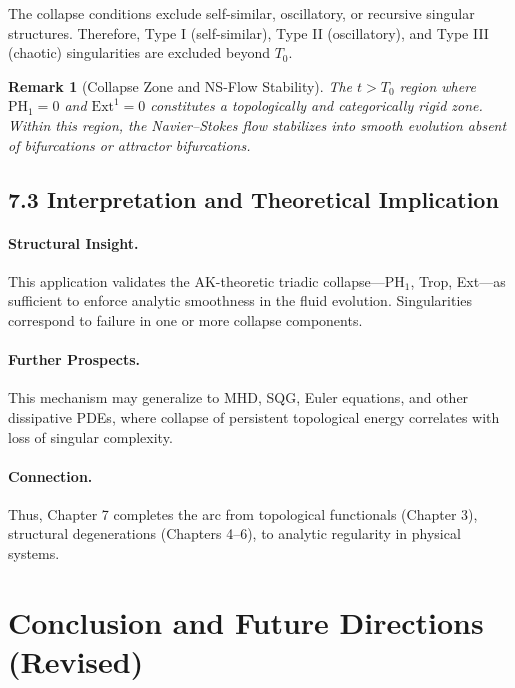 \documentclass[11pt]{article}
\newtheorem{remark}[theorem]{Remark}
\begin{document}
\begin{corollary}
The collapse conditions exclude self-similar, oscillatory, or recursive singular structures. Therefore, Type I (self-similar), Type II (oscillatory), and Type III (chaotic) singularities are excluded beyond $T_0$.
\end{corollary}

\begin{remark}[Collapse Zone and NS-Flow Stability]
The $t > T_0$ region where $\mathrm{PH}_1 = 0$ and $\mathrm{Ext}^1 = 0$ constitutes a topologically and categorically rigid zone. Within this region, the Navier--Stokes flow stabilizes into smooth evolution absent of bifurcations or attractor bifurcations.
\end{remark}

\subsection{7.3 Interpretation and Theoretical Implication}

\paragraph{Structural Insight.}
This application validates the AK-theoretic triadic collapse—PH$_1$, Trop, Ext—as sufficient to enforce analytic smoothness in the fluid evolution. Singularities correspond to failure in one or more collapse components.

\paragraph{Further Prospects.}
This mechanism may generalize to MHD, SQG, Euler equations, and other dissipative PDEs, where collapse of persistent topological energy correlates with loss of singular complexity.

\paragraph{Connection.}
Thus, Chapter 7 completes the arc from topological functionals (Chapter 3), structural degenerations (Chapters 4–6), to analytic regularity in physical systems.



\section{Conclusion and Future Directions (Revised)}
\end{document}
